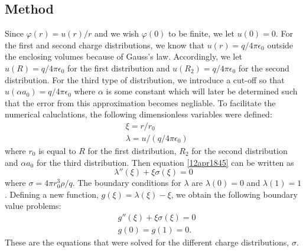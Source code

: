 \documentclass[twocolumn]{article}
\begin{document}
\begin{large}
\subsection*{Method}
Since $\varphi(r) = u(r)/r$ and we wish $\varphi(0)$ to be finite, we let $u(0) = 0$. For the first and second charge distributions, we know that $u(r) = q/4\pi\epsilon_0$ outside the enclosing volumes because of Gauss's law. Accordingly, we let $u(R) = q/4\pi\epsilon_0$ for the first distribution and $u(R_2) = q/4\pi\epsilon_0$ for the second distribution. For the third type of distribution, we introduce a cut-off so that $u(\alpha a_0) = q/4\pi\epsilon_0$ where $\alpha$ is some constant which will later be determined such that the error from this approximation becomes negliable. To facilitate the numerical caluclations, the following dimensionless variables were defined:
\begin{equation}
    \begin{split}
        &\xi = r/r_0 \\ 
        &\lambda = u/(q/4\pi\epsilon_0)
    \end{split}
\end{equation}
where $r_0$ is equal to $R$ for the first distribution, $R_2$ for the second distribution and $\alpha a_0$ for the third distribution. Then equation \eqref{12apr1845} can be written as
\begin{equation}
    \lambda''(\xi) + \xi\sigma(\xi) = 0
\end{equation}
where $\sigma = 4\pi r_0^3\rho/q$. The boundary conditions for $\lambda$ are $\lambda(0) = 0$ and $\lambda(1)=1$. Defining a new function, $g(\xi) = \lambda(\xi) - \xi$, we obtain the following boundary value problems:
\begin{equation}
    \label{17apr0918}
    \begin{split}
        &g''(\xi) + \xi\sigma(\xi) = 0 \\ 
        &g(0) = g(1) = 0.
    \end{split}
\end{equation}
These are the equations that were solved for the different charge distributions, $\sigma$.


\end{large}
\end{document}
